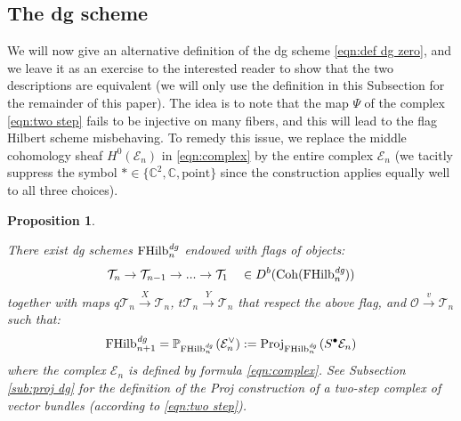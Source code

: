 \documentclass[12pt]{amsart}
\numberwithin{equation}{section}
\newtheorem{proposition}[theorem]{Proposition}
\theoremstyle{definition}
\theoremstyle{remark}
\newcommand{\CC}{\mathbb{C}}
\newcommand{\PP}{\mathbb{P}}
\newcommand{\CE}{\mathcal{E}}
\newcommand{\CO}{\mathcal{O}}
\newcommand{\CT}{\mathcal{T}}
\renewcommand{\1}{\mathbf{1}}
\newcommand{\coh}{\mathrm{Coh}}
\newcommand{\FH}{\mathrm{FHilb}}
\newcommand{\point}{\mathrm{point}}
\newcommand{\proj}{\mathrm{Proj}}
\newcommand{\edg}{\emph{dg}}
\begin{document}
\subsection{The dg scheme}
\label{sub:dg scheme} 

We will now give an alternative definition of the dg scheme \eqref{eqn:def dg zero}, and we leave it as an exercise to the interested reader to show that the two descriptions are equivalent (we will only use the definition in this Subsection for the remainder of this paper). The idea is to note that the map $\Psi$ of the complex \eqref{eqn:two step} fails to be injective on many fibers, and this will lead to the flag Hilbert scheme misbehaving. To remedy this issue, we replace the middle cohomology sheaf $H^0 (\CE_n)$ in \eqref{eqn:complex} by the entire complex $\CE_n$ (we tacitly suppress the symbol $* \in \{\CC^2,\CC,\point\}$ since the construction applies equally well to all three choices). %

\begin{proposition}
\label{prop:dg scheme}

There exist dg schemes $\FH_n^\edg$ endowed with flags of objects:
$$
\CT_n \rightarrow \CT_{n-1} \rightarrow ... \rightarrow \CT_1 \quad \in D^b(\coh(\FH_n^\edg))
$$
together with maps $q\CT_n \stackrel{X}\rightarrow \CT_n$, $t\CT_n \stackrel{Y}\rightarrow \CT_n$ that respect the above flag, and $\CO \stackrel{v}\rightarrow \CT_n$ such that:
\begin{equation}
\label{eqn:def dg}
\FH_{n+1}^\edg = \PP_{\FH^\edg_{n}} \left( \CE_n^\vee  \right) := \proj_{\FH^\edg_{n}} \left(S^\bullet\CE_n\right)
\end{equation}
where the complex $\CE_n$ is defined by formula \eqref{eqn:complex}. See Subsection \ref{sub:proj dg} for the definition of the Proj construction of a two-step complex of vector bundles (according to \eqref{eqn:two step}).

\end{proposition}
\end{document}
